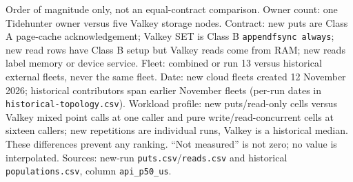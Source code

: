 \begin{table}[H]\centering{}
\caption{Order of magnitude only, not an equal-contract comparison.
Owner count: one Tidehunter owner versus five Valkey storage nodes.
Contract: new puts are Class A page-cache acknowledgement; Valkey SET is
Class B \texttt{appendfsync always}; new read rows have Class B setup but
Valkey reads come from RAM; new reads label memory or device service. Fleet: combined
or run 13 versus historical external fleets, never the same fleet.
Date: new cloud fleets created 12 November 2026; historical contributors
span earlier November fleets (per-run dates in \texttt{historical-topology.csv}).
Workload profile: new puts/read-only cells versus Valkey mixed point calls
at one caller and pure write/read-concurrent cells at sixteen callers;
new repetitions are individual runs, Valkey is a historical median.
These differences prevent any ranking. ``Not measured'' is not zero;
no value is interpolated. Sources: new-run \texttt{puts.csv}/\texttt{reads.csv}
and historical \texttt{populations.csv}, column \texttt{api\_p50\_us}.}
\end{table}

